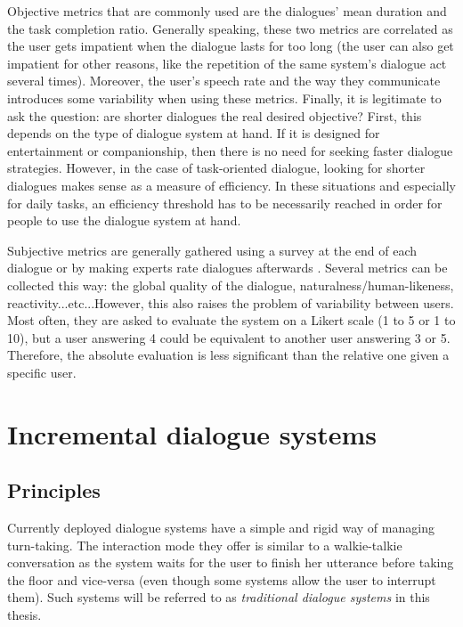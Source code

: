                         Objective metrics that are commonly used are the dialogues' mean duration and the task completion ratio. Generally speaking, these two metrics are correlated as the user gets impatient when the dialogue lasts for too long (the user can also get impatient for other reasons, like the repetition of the same system's dialogue act several times). Moreover, the user's speech rate and the way they communicate introduces some variability when using these metrics. Finally, it is legitimate to ask the question: are shorter dialogues the real desired objective? First, this depends on the type of dialogue system at hand. If it is designed for entertainment or companionship, then there is no need for seeking faster dialogue strategies. However, in the case of task-oriented dialogue, looking for shorter dialogues makes sense as a measure of efficiency. In these situations and especially for daily tasks, an efficiency threshold has to be necessarily reached in order for people to use the dialogue system at hand.

                        Subjective metrics are generally gathered using a survey at the end of each dialogue or by making experts rate dialogues afterwards \cite{El-Asri2014b}. Several metrics can be collected this way: the global quality of the dialogue, naturalness/human-likeness, reactivity...etc...However, this also raises the problem of variability between users. Most often, they are asked to evaluate the system on a Likert scale (1 to 5 or 1 to 10), but a user answering 4 could be equivalent to another user answering 3 or 5. Therefore, the absolute evaluation is less significant than the relative one given a specific user.
                        

\section{Incremental dialogue systems}

\subsection{Principles}

Currently deployed dialogue systems have a simple and rigid way of managing turn-taking. The interaction mode they offer is similar to a walkie-talkie conversation as the system waits for the user to finish her utterance before taking the floor and vice-versa (even though some systems allow the user to interrupt them). Such systems will be referred to as \textit{traditional dialogue systems} in this thesis.
    
